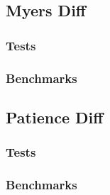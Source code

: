 \subsection{Myers Diff}

\subsubsection{Tests}

\subsubsection{Benchmarks}

\subsection{Patience Diff}

\subsubsection{Tests}

\subsubsection{Benchmarks}